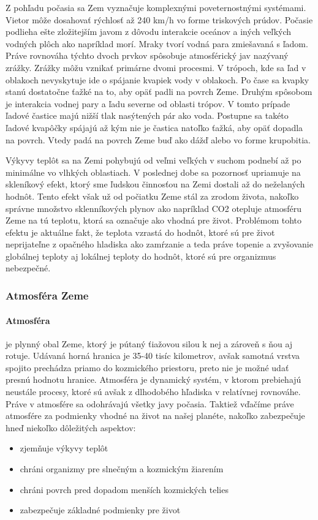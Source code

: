 Z pohľadu počasia sa Zem vyznačuje komplexnými poveternostnými systémami. Vietor môže dosahovať rýchlosť až 240 km/h vo forme triskových prúdov. Počasie podlieha ešte zložitejším javom z dôvodu interakcie oceánov a iných veľkých vodných plôch ako napríklad morí. Mraky tvorí vodná para zmiešavaná s ľadom. Práve rovnováha týchto dvoch prvkov spôsobuje atmosférický jav nazývaný zrážky. Zrážky môžu vznikať primárne dvomi procesmi. V trópoch, kde sa ľad v oblakoch nevyskytuje ide o spájanie kvapiek vody v oblakoch. Po čase sa kvapky stanú dostatočne ťažké na to, aby opäť padli na povrch Zeme. Druhým spôsobom je interakcia vodnej pary a ľadu severne od oblasti trópov. V tomto prípade ľadové častice majú nižší tlak nasýtených pár ako voda. Postupne sa takéto ľadové kvapôčky spájajú až kým nie je častica natoľko ťažká, aby opäť dopadla na povrch. Vtedy padá na povrch Zeme buď ako dážď alebo vo forme krupobitia.

Výkyvy teplôt sa na Zemi pohybujú od veľmi veľkých v suchom podnebí až po minimálne vo vlhkých oblastiach. V poslednej dobe sa pozornosť upriamuje na skleníkový efekt, ktorý sme ľudskou činnosťou na Zemi dostali až do neželaných hodnôt. Tento efekt však už od počiatku Zeme stál za zrodom života, nakoľko správne množstvo sklenníkových plynov ako napríklad CO2 otepluje atmosféru Zeme na tú teplotu, ktorá sa označuje ako vhodná pre život. Problémom tohto efektu je aktuálne fakt, že teplota vzrastá do hodnôt, ktoré sú pre život neprijateľne z opačného hladiska ako zamŕzanie a teda práve topenie a zvyšovanie globálnej teploty aj lokálnej teploty do hodnôt, ktoré sú pre organizmus nebezpečné.

\subsubsection{Atmosféra Zeme}
\label{atmosferaZeme}
\paragraph{Atmosféra}je plynný obal Zeme, ktorý je pútaný ťiažovou silou k nej a zároveň s ňou aj rotuje. Udávaná horná hranica je 35-40 tisíc kilometrov, avšak samotná vrstva spojito prechádza priamo do kozmického priestoru, preto nie je možné udať presnú hodnotu hranice. Atmosféra je dynamický systém, v ktorom prebiehajú neustále procesy, ktoré sú avšak z dlhodobého hľadiska v relatívnej rovnováhe. Práve v atmosfére sa odohrávajú všetky javy počasia. Taktiež vďačíme práve atmosfére za podmienky vhodné na život na našej planéte, nakoľko zabezpečuje hneď niekoľko dôležitých aspektov:
\begin{itemize}
  \item zjemňuje výkyvy teplôt
  \item chráni organizmy pre slnečným a kozmickým žiarením
  \item chráni povrch pred dopadom menších kozmických telies
  \item zabezpečuje základné podmienky pre život
\end{itemize}

